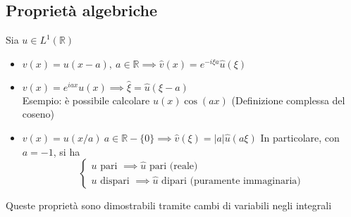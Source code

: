 \documentclass[a4paper]{article}
\newcommand{\R}{\mathbb{R}}
\begin{document}
\subsection{Proprietà algebriche}
Sia $u\in L^{1}(\R)$ 
\begin{itemize}
	\item $v(x)=u(x-a), \ a\in \R\implies \hat{v}(x)=e^{-i\xi a}\hat{u}(\xi)$
	\item $v(x)=e^{iax}u(x)\implies \hat{\xi}=\hat{u}(\xi-a)$
\\		Esempio: è possibile calcolare $u(x)\cos(ax)$ (Definizione complessa del coseno)
\item $v(x)=u(x / a)\ a\in \R- \{0\} \implies \hat{v}(\xi)=|a|\hat{u}(a\xi)$
	In particolare, con $a=-1$, si ha
	\[\begin{cases}
		u\text{ pari }\implies \hat{u} \text{ pari (reale)}\\
		u\text{ dispari }\implies \hat{u}\text{ dipari (puramente immaginaria)}
	\end{cases}\]

\end{itemize}
Queste proprietà sono dimostrabili tramite cambi di variabili negli integrali
\end{document}
